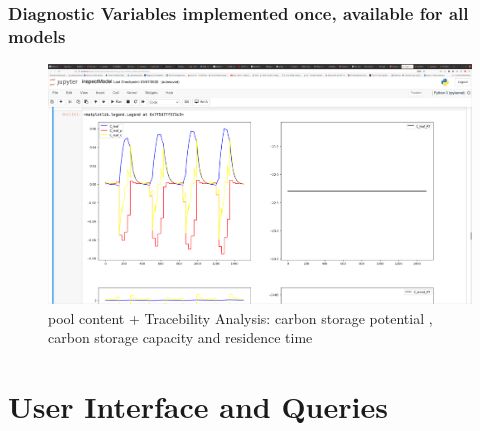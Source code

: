 \begin{frame}
	\frametitle{Diagnostic Variables implemented once, available for all models}
	\begin{figure}
	\includegraphics[width=\textwidth]{TracebilityAnalysis.png}
	\caption{pool content + Tracebility Analysis: carbon storage potential , carbon storage capacity and residence time}
	\end{figure}
\end{frame}

\section{User Interface and Queries}
